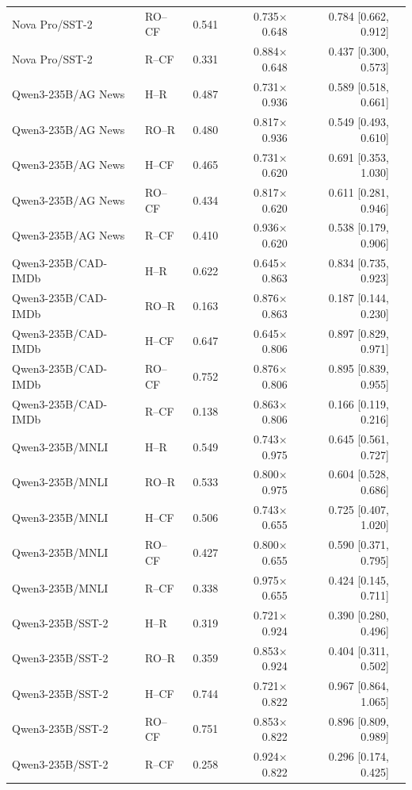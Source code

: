 \begin{table}[t]
\begin{tabular}{llrrrl}
Nova Pro/SST-2 & RO--CF & 0.541 & 0.735$\times$0.648 & 0.784 [0.662, 0.912] &  \\
Nova Pro/SST-2 & R--CF & 0.331 & 0.884$\times$0.648 & 0.437 [0.300, 0.573] &  \\
Qwen3-235B/AG News & H--R & 0.487 & 0.731$\times$0.936 & 0.589 [0.518, 0.661] &  \\
Qwen3-235B/AG News & RO--R & 0.480 & 0.817$\times$0.936 & 0.549 [0.493, 0.610] &  \\
Qwen3-235B/AG News & H--CF & 0.465 & 0.731$\times$0.620 & 0.691 [0.353, 1.030] &  \\
Qwen3-235B/AG News & RO--CF & 0.434 & 0.817$\times$0.620 & 0.611 [0.281, 0.946] &  \\
Qwen3-235B/AG News & R--CF & 0.410 & 0.936$\times$0.620 & 0.538 [0.179, 0.906] &  \\
Qwen3-235B/CAD-IMDb & H--R & 0.622 & 0.645$\times$0.863 & 0.834 [0.735, 0.923] &  \\
Qwen3-235B/CAD-IMDb & RO--R & 0.163 & 0.876$\times$0.863 & 0.187 [0.144, 0.230] &  \\
Qwen3-235B/CAD-IMDb & H--CF & 0.647 & 0.645$\times$0.806 & 0.897 [0.829, 0.971] &  \\
Qwen3-235B/CAD-IMDb & RO--CF & 0.752 & 0.876$\times$0.806 & 0.895 [0.839, 0.955] &  \\
Qwen3-235B/CAD-IMDb & R--CF & 0.138 & 0.863$\times$0.806 & 0.166 [0.119, 0.216] &  \\
Qwen3-235B/MNLI & H--R & 0.549 & 0.743$\times$0.975 & 0.645 [0.561, 0.727] &  \\
Qwen3-235B/MNLI & RO--R & 0.533 & 0.800$\times$0.975 & 0.604 [0.528, 0.686] &  \\
Qwen3-235B/MNLI & H--CF & 0.506 & 0.743$\times$0.655 & 0.725 [0.407, 1.020] &  \\
Qwen3-235B/MNLI & RO--CF & 0.427 & 0.800$\times$0.655 & 0.590 [0.371, 0.795] &  \\
Qwen3-235B/MNLI & R--CF & 0.338 & 0.975$\times$0.655 & 0.424 [0.145, 0.711] &  \\
Qwen3-235B/SST-2 & H--R & 0.319 & 0.721$\times$0.924 & 0.390 [0.280, 0.496] &  \\
Qwen3-235B/SST-2 & RO--R & 0.359 & 0.853$\times$0.924 & 0.404 [0.311, 0.502] &  \\
Qwen3-235B/SST-2 & H--CF & 0.744 & 0.721$\times$0.822 & 0.967 [0.864, 1.065] &  \\
Qwen3-235B/SST-2 & RO--CF & 0.751 & 0.853$\times$0.822 & 0.896 [0.809, 0.989] &  \\
Qwen3-235B/SST-2 & R--CF & 0.258 & 0.924$\times$0.822 & 0.296 [0.174, 0.425] &  \\
\bottomrule
\end{tabular}
\end{table}
